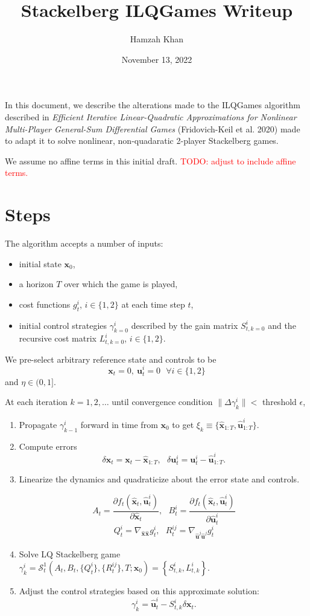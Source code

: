 \documentclass[11pt]{article}
\title{Stackelberg ILQGames Writeup}
\author{Hamzah Khan} \date{November 13, 2022}
\newcommand\dd[2]{\frac{\partial#1}{\partial#2}}
\newcommand\truestate[1]{\bm{x}_{#1}}
\newcommand\stack[2]{\mathcal{S}^{#1}_{#2}}
\newcommand\ctrl[2]{\bm{u}^{#1}_{#2}}
\newcommand\horizon{T}
\newcommand\stackmeas[2]{\bm{\hat{x}}^{#1}_{#2}}
\newcommand\ctrlhat[2]{\bm{\hat{u}}^{#1}_{#2}}
\newcommand\todo[1]{\textcolor{red}{TODO: #1}}
\begin{document}
\maketitle

In this document, we describe the alterations made to the ILQGames algorithm described in \emph{Efficient Iterative Linear-Quadratic Approximations for Nonlinear Multi-Player General-Sum Differential Games} (Fridovich-Keil et al. 2020) made to adapt it to solve nonlinear, non-quadaratic 2-player Stackelberg games.

We assume no affine terms in this initial draft. \todo{adjust to include affine terms.}

\section{Steps}
The algorithm accepts a number of inputs:
\begin{itemize}
\item initial state $\truestate{0}$,
\item a horizon $\horizon$ over which the game is played,
\item cost functions $g^i_t$, $i \in \{1, 2\}$ at each time step $t$,
\item initial control strategies $\gamma^i_{k=0}$ described by the gain matrix $S^i_{t, k=0}$ and the recursive cost matrix $L^i_{t, k=0}$, $i \in \{1, 2\}$.
\end{itemize}

We pre-select arbitrary reference state and controls to be
\[ \truestate{t} = 0, ~ \ctrl{i}{t} = 0 ~~~ \forall i \in \{ 1, 2 \} \]
and $\eta \in (0, 1]$.

At each iteration $k = 1, 2, \ldots$ until convergence condition $\| \Delta \gamma^i_{k} \| < $ threshold $\epsilon$,
\begin{enumerate}
\item Propagate $\gamma^i_{k-1}$ forward in time from $\truestate{0}$ to get $\xi_k \equiv \{ \stackmeas{}{1:\horizon}, \ctrlhat{i}{1:\horizon} \}$.

\item Compute errors
\[ \delta \truestate{t} = \truestate{t} - \stackmeas{}{1:\horizon}, ~~~ \delta \ctrl{i}{t} = \ctrl{i}{t} -  \ctrlhat{i}{1:\horizon}. \]

\item Linearize the dynamics and quadraticize about the error state and controls.

\[ A_t = \dd{f_t(\stackmeas{}{t}, \ctrlhat{i}{t})}{\stackmeas{}{t}}, ~~~ B^i_t = \dd{f_t(\stackmeas{}{t}, \ctrlhat{i}{t})}{\ctrlhat{i}{t}} \]
\[ Q^i_t = \nabla_{\stackmeas{}{}\stackmeas{}{}} g^i_t, ~~~ R^{ij}_t = \nabla_{\ctrlhat{j}{}\ctrlhat{j}{}} g^i_t \]

\item Solve LQ Stackelberg game $\gamma^i_{k} = \stack{1}{t}(A_t, B_t, \{ Q^i_t \}, \{ R^{ij}_t \}, \horizon; \truestate{0}) = \left\{ S^i_{t, k}, L^i_{t, k} \right\}$.

\item Adjust the control strategies based on this approximate solution:
\[ \gamma^i_k = \ctrlhat{i}{t} - S^i_{t, k} \delta\truestate{t}.  \]
\end{enumerate}
\end{document}
